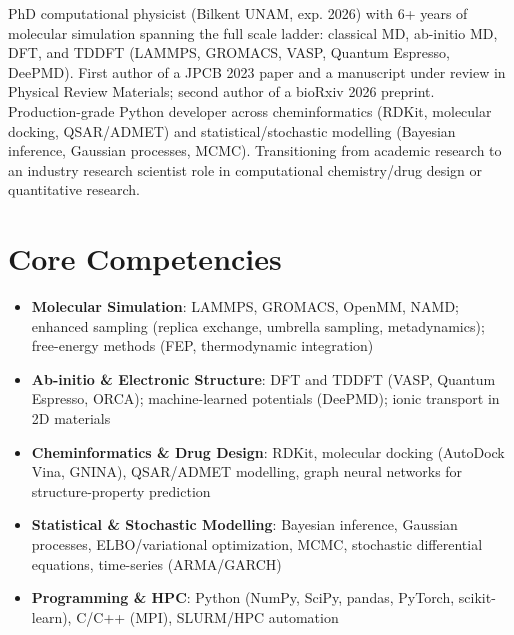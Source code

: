 \documentclass[11pt,a4paper,sans]{moderncv}
\begin{document}
\makecvtitle


\vspace{6pt}
\small{PhD computational physicist (Bilkent UNAM, exp. 2026) with 6+ years of molecular simulation spanning the full scale ladder: classical MD, ab-initio MD, DFT, and TDDFT (LAMMPS, GROMACS, VASP, Quantum Espresso, DeePMD). First author of a JPCB 2023 paper and a manuscript under review in Physical Review Materials; second author of a bioRxiv 2026 preprint. Production-grade Python developer across cheminformatics (RDKit, molecular docking, QSAR/ADMET) and statistical/stochastic modelling (Bayesian inference, Gaussian processes, MCMC). Transitioning from academic research to an industry research scientist role in computational chemistry/drug design or quantitative research.}


\section{Core Competencies}
\vspace{1pt}
\begin{itemize}

\item \textbf{Molecular Simulation}: LAMMPS, GROMACS, OpenMM, NAMD; enhanced sampling (replica exchange, umbrella sampling, metadynamics); free-energy methods (FEP, thermodynamic integration)

\item \textbf{Ab-initio \& Electronic Structure}: DFT and TDDFT (VASP, Quantum Espresso, ORCA); machine-learned potentials (DeePMD); ionic transport in 2D materials

\item \textbf{Cheminformatics \& Drug Design}: RDKit, molecular docking (AutoDock Vina, GNINA), QSAR/ADMET modelling, graph neural networks for structure-property prediction

\item \textbf{Statistical \& Stochastic Modelling}: Bayesian inference, Gaussian processes, ELBO/variational optimization, MCMC, stochastic differential equations, time-series (ARMA/GARCH)

\item \textbf{Programming \& HPC}: Python (NumPy, SciPy, pandas, PyTorch, scikit-learn), C/C++ (MPI), SLURM/HPC automation

\end{itemize}
\end{document}
